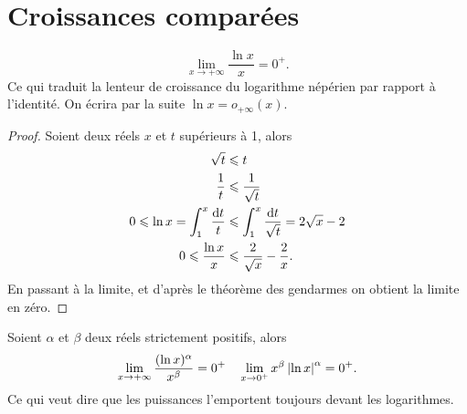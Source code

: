 \section{Croissances comparées}
\label{sec:chap1-croissancescomparees}
\begin{theo}
  \begin{equation}
    \lim\limits_{x \to +\infty} \frac{\ln x}{x}=0^+.
  \end{equation}
  Ce qui traduit la \og lenteur \fg{} de croissance du logarithme népérien par rapport à l'identité. On écrira par la suite \(\ln x=o_{+\infty}(x)\).
\end{theo}
\begin{proof}
  Soient deux réels \(x\) et \(t\) supérieurs à 1, alors
  \begin{align}
    \sqrt{t} & \leqslant t \\
    \frac{1}{t} &\leqslant \frac{1}{\sqrt{t}}\\
    0 \leqslant \ln x = \int_{1}^{x} \frac{\mathop{}\mathopen{}\mathrm{d} t}{t} &\leqslant \int_1^x\frac{\mathop{}\mathopen{}\mathrm{d} t}{\sqrt{t}}=2\sqrt{x}-2\\
    0 \leqslant \frac{\ln x}{x} &\leqslant \frac{2}{\sqrt{x}} - \frac{2}{x}.
  \end{align}
  En passant à la limite, et d'après le théorème des gendarmes on obtient la limite en zéro.
\end{proof}
%
\begin{prop}
  \label{prop-chap1:croissancecomparelnpuissance}
  Soient \(\alpha\) et \(\beta\) deux réels strictement positifs, alors
  \begin{equation}
    \lim\limits_{x \to +\infty} \frac{(\ln x)^\alpha}{x^\beta} = 0^+ \quad \lim\limits_{x \to 0^+} x^\beta \left\lvert\ln x\right\rvert^\alpha=0^+.
  \end{equation}
  Ce qui veut dire que les puissances \og l'emportent \fg{} toujours devant les logarithmes.
\end{prop}
